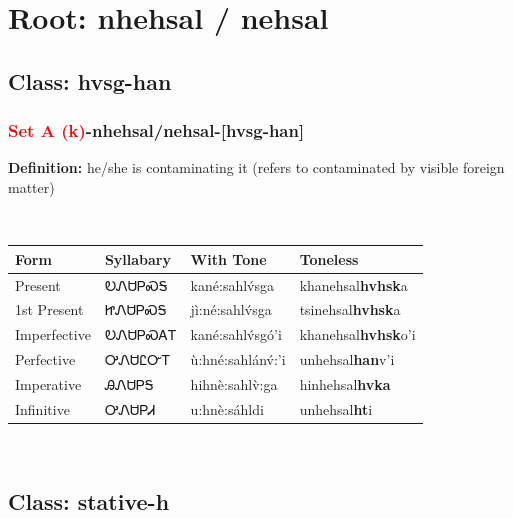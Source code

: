 \needspace{4in}
\section*{Root: nhehsal / nehsal}
\nopagebreak
{}
\needspace{3in}
\subsection*{Class: hvsg-han}
\nopagebreak
\needspace{2in}
\subsubsection*{\textcolor{Red}{Set A (k)}{-}\textbf{nhehsal/nehsal}{-}[hvsg-han]}
\nopagebreak
\textbf{Definition: } he/she is contaminating it (refers to contaminated by visible foreign matter)
\\[0.5em]
\begin{tabularx}{\textwidth}{l X X X}%
\toprule%
\textbf{Form}&\textbf{Syllabary}&\textbf{With Tone}&\textbf{Toneless}\\%
\midrule%
Present&ᎧᏁᏌᏢᏍᎦ&kané:sahlv́sga&khanehsal\textbf{hvhsk}a\\%
1st Present&ᏥᏁᏌᏢᏍᎦ&jì:né:sahlv́sga&tsinehsal\textbf{hvhsk}a\\%
Imperfective&ᎧᏁᏌᏢᏍᎪᎢ&kané:sahlv́sgó’i&khanehsal\textbf{hvhsk}o'i\\%
Perfective&ᎤᏁᏌᏝᏅᎢ&ù:hné:sahlánv́:’i&unhehsal\textbf{han}v'i\\%
Imperative&ᎯᏁᏌᏢᎦ&hihnè:sahlv̀:ga&hinhehsal\textbf{hvka}\\%
Infinitive&ᎤᏁᏌᏢᏗ&u:hnè:sáhldi&unhehsal\textbf{ht}i\\%
\bottomrule%
\end{tabularx}
\\[1em]
\needspace{3in}
\subsection*{Class: stative-h}
\nopagebreak
\needspace{2in}
